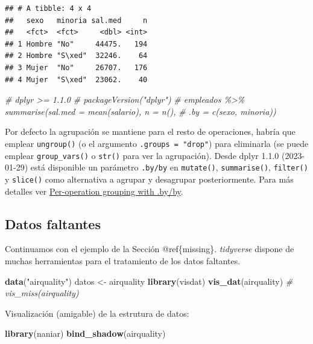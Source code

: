\documentclass[
]{book}
\newenvironment{Shaded}{\begin{snugshade}}{\end{snugshade}}
\newcommand{\CommentTok}[1]{\textcolor[rgb]{0.56,0.35,0.01}{\textit{#1}}}
\newcommand{\FunctionTok}[1]{\textcolor[rgb]{0.13,0.29,0.53}{\textbf{#1}}}
\newcommand{\NormalTok}[1]{#1}
\newcommand{\OtherTok}[1]{\textcolor[rgb]{0.56,0.35,0.01}{#1}}
\newcommand{\StringTok}[1]{\textcolor[rgb]{0.31,0.60,0.02}{#1}}
\begin{document}
\begin{verbatim}
## # A tibble: 4 x 4
##   sexo   minoria sal.med     n
##   <fct>  <fct>     <dbl> <int>
## 1 Hombre "No"     44475.   194
## 2 Hombre "S\xed"  32246.    64
## 3 Mujer  "No"     26707.   176
## 4 Mujer  "S\xed"  23062.    40
\end{verbatim}

\begin{Shaded}
\begin{Highlighting}[]
\CommentTok{\# dplyr \textgreater{}= 1.1.0 \# packageVersion("dplyr")}
\CommentTok{\# empleados \%\textgreater{}\% summarise(sal.med = mean(salario), n = n(), }
\CommentTok{\#                         .by = c(sexo, minoria))}
\end{Highlighting}
\end{Shaded}

Por defecto la agrupación se mantiene para el resto de operaciones, habría que emplear \texttt{ungroup()} (o el argumento \texttt{.groups\ =\ "drop"}) para eliminarla (se puede emplear \texttt{group\_vars()} o \texttt{str()} para ver la agrupación).
Desde dplyr 1.1.0 (2023-01-29) está disponible un parámetro \texttt{.by/by} en \texttt{mutate()}, \texttt{summarise()}, \texttt{filter()} y \texttt{slice()} como alternativa a agrupar y desagrupar posteriormente.
Para más detalles ver \href{https://dplyr.tidyverse.org/reference/dplyr_by.html}{Per-operation grouping with .by/by}.

\subsection{Datos faltantes}\label{tidyr-missing}

Continuamos con el ejemplo de la Sección @ref\{missing\}.
\emph{tidyverse} dispone de muchas herramientas para el tratamiento de los datos faltantes.

\begin{Shaded}
\begin{Highlighting}[]
\FunctionTok{data}\NormalTok{(}\StringTok{"airquality"}\NormalTok{)}
\NormalTok{datos }\OtherTok{\textless{}{-}}\NormalTok{ airquality}
\FunctionTok{library}\NormalTok{(visdat)}
\FunctionTok{vis\_dat}\NormalTok{(airquality)}
\CommentTok{\# vis\_miss(airquality)}
\end{Highlighting}
\end{Shaded}

Visualización (amigable) de la estrutura de datos:

\begin{Shaded}
\begin{Highlighting}[]
\FunctionTok{library}\NormalTok{(naniar)}
\FunctionTok{bind\_shadow}\NormalTok{(airquality)}
\end{Highlighting}
\end{Shaded}
\end{document}

